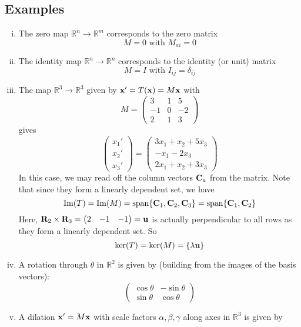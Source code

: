 \subsection{Examples}
\begin{enumerate}[(i)]
	\item The zero map $\mathbb R^n \to \mathbb R^m$ corresponds to the zero matrix
	      \[ M = 0 \text{ with } M_{ai} = 0 \]
	\item The identity map $\mathbb R^n \to \mathbb R^n$ corresponds to the identity (or unit) matrix
	      \[ M = I \text{ with } I_{ij} = \delta_{ij} \]
	\item The map $\mathbb R^3 \to \mathbb R^3$ given by $\vb x' = T(\vb x) = M\vb x$ with
	      \[ M = \begin{pmatrix}
			      3  & 1 & 5  \\
			      -1 & 0 & -2 \\
			      2  & 1 & 3
		      \end{pmatrix} \]
	      gives
	      \[
		      \begin{pmatrix}
			      x_1' \\ x_2' \\ x_3'
		      \end{pmatrix}
		      =
		      \begin{pmatrix}
			      3x_1 + x_2 + 5x_3 \\
			      -x_1 - 2x_3       \\
			      2x_1 + x_2 + 3x_3
		      \end{pmatrix}
	      \]
	      In this case, we may read off the column vectors $\vb C_a$ from the matrix. Note that since they form a linearly dependent set, we have
	      \[ \Im(T) = \Im(M) = \operatorname{span} \{ \vb C_1, \vb C_2, \vb C_3 \} = \operatorname{span} \{ \vb C_1, \vb C_2 \} \]
	      Here, $\vb R_2 \times \vb R_3 = \begin{pmatrix}
			      2 & -1 & -1
		      \end{pmatrix} = \vb u$ is actually perpendicular to all rows as they form a linearly dependent set. So
	      \[ \ker(T) = \ker(M) = \{ \lambda \vb u \} \]
	\item A rotation through $\theta$ in $\mathbb R^2$ is given by (building from the images of the basis vectors):
	      \[ \begin{pmatrix}
			      \cos \theta & -\sin \theta \\
			      \sin \theta & \cos \theta
		      \end{pmatrix} \]
	\item A dilation $\vb x' = M \vb x$ with scale factors $\alpha, \beta, \gamma$ along axes in $\mathbb R^3$ is given by

\end{enumerate}
